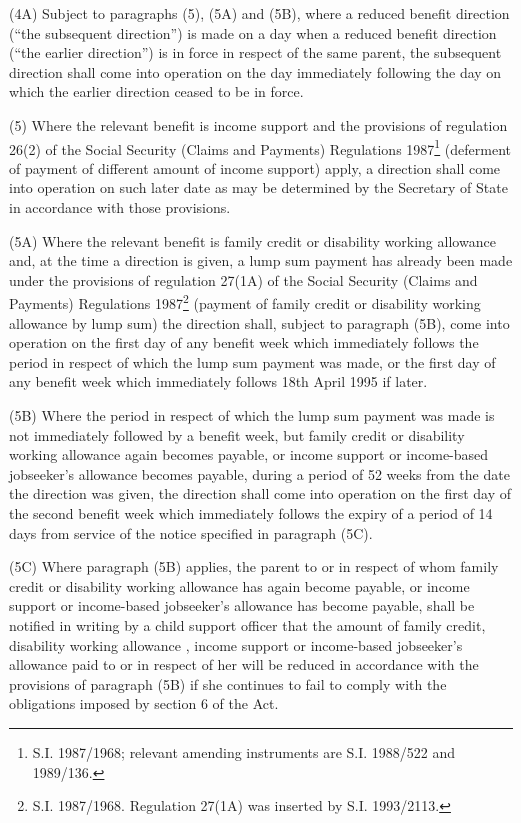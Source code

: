 \documentclass[a4paper]{article}
\begin{document}
(4A) Subject to paragraphs (5), (5A) and (5B), where a reduced benefit direction (“the subsequent direction”) is made on a day when a reduced benefit direction (“the earlier direction”) is in force in respect of the same parent, the subsequent direction shall come into operation on the day immediately following the day on which the earlier direction ceased to be in force.

(5) Where the relevant benefit is income support and the provisions of regulation 26(2) of the Social Security (Claims and Payments) Regulations 1987\footnote{\frenchspacing S.I. 1987/1968; relevant amending instruments are S.I. 1988/522 and 1989/136.} (deferment of payment of different amount of income support) apply, a direction shall come into operation on such later date as may be determined by the Secretary of State in accordance with those provisions.

(5A) Where the relevant benefit is family credit or disability working allowance and, at the time a direction is given, a lump sum payment has already been made under the provisions of regulation 27(1A) of the Social Security (Claims and Payments) Regulations 1987\footnote{\frenchspacing S.I. 1987/1968. Regulation 27(1A) was inserted by S.I. 1993/2113.} (payment of family credit or disability working allowance by lump sum) the direction shall, subject to paragraph (5B), come into operation on the first day of any benefit week which immediately follows the period in respect of which the lump sum payment was made, or the first day of any benefit week which immediately follows 18th April 1995 if later.

(5B) Where the period in respect of which the lump sum payment was made is not immediately followed by a benefit week, but family credit or disability working allowance again becomes payable, or income support 
or income-based jobseeker’s allowance  %
becomes payable, during a period of 52 weeks from the date the direction was given, the direction shall come into operation on the first day of the second benefit week which immediately follows the expiry of a period of 14 days from service of the notice specified in paragraph (5C).

(5C) Where paragraph (5B) applies, the parent to or in respect of whom family credit or disability working allowance has again become payable, or income support 
or income-based jobseeker’s allowance  %
has become payable, shall be notified in writing by a child support officer that the amount of family credit, disability working allowance%
, income support or income-based jobseeker’s allowance  %
paid to or in respect of her will be reduced in accordance with the provisions of paragraph (5B) if she continues to fail to comply with the obligations imposed by section 6 of the Act.
\end{document}
